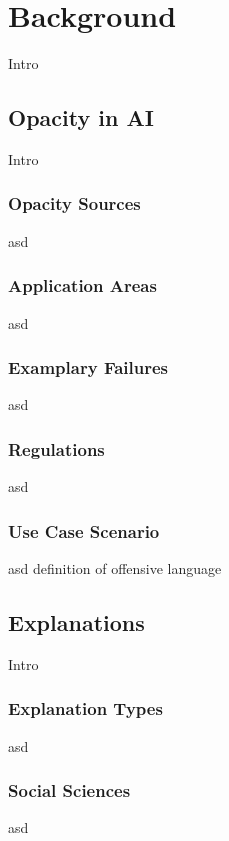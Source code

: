 \section{Background}

Intro


\subsection{Opacity in AI}
Intro

\subsubsection{Opacity Sources}
asd

\subsubsection{Application Areas}
asd

\subsubsection{Examplary Failures}
asd

\subsubsection{Regulations}
asd

\subsubsection{Use Case Scenario}
asd
definition of offensive language 



\subsection{Explanations}
Intro

\subsubsection{Explanation Types}
asd

\subsubsection{Social Sciences}
asd


